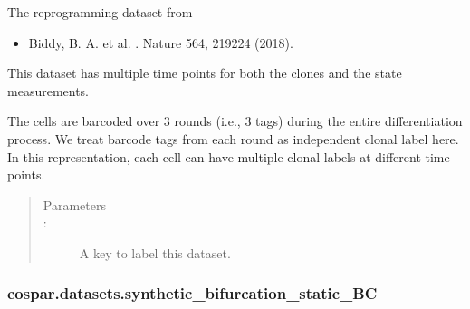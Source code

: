 \documentclass[letterpaper,10pt,english]{sphinxmanual}
\begin{document}
\begin{fulllineitems}
\label{\detokenize{cospar.datasets.reprogramming_merge_tags:cospar.datasets.reprogramming_merge_tags}}
The reprogramming dataset from
\begin{itemize}
\item {} 
Biddy, B. A. et al. . Nature 564, 219\textendash{}224 (2018).

\end{itemize}

This dataset has multiple time points for both the clones and the state measurements.

The cells are barcoded over 3 rounds (i.e., 3 tags) during the entire differentiation
process. We treat barcode tags from each round as independent clonal label
here. In this representation, each cell can have multiple clonal labels
at different time points.
\begin{quote}\begin{description}
\item[{Parameters}] \leavevmode\item[{ : }] \leavevmode
A key to label this dataset.


\end{description}\end{quote}

\end{fulllineitems}



\subsubsection{cospar.datasets.synthetic\_bifurcation\_static\_BC}
\label{\detokenize{cospar.datasets.synthetic_bifurcation_static_BC:cospar-datasets-synthetic-bifurcation-static-bc}}\label{\detokenize{cospar.datasets.synthetic_bifurcation_static_BC::doc}}
\end{document}

